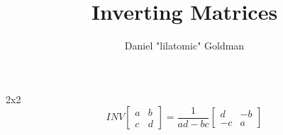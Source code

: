 \documentclass{../templates/mathtool}
\title{Inverting Matrices}
\author{Daniel "lilatomic" Goldman}
\begin{document}
\maketitle

\begin{section}{2x2}
	\[ INV
		\begin{bmatrix}
			a & b \\
			c & d
		\end{bmatrix}
		=
		\frac{1}{ad-bc}
		\begin{bmatrix}
			d & -b \\
			-c & a
		\end{bmatrix}
	\]
\end{section}
\end{document}
